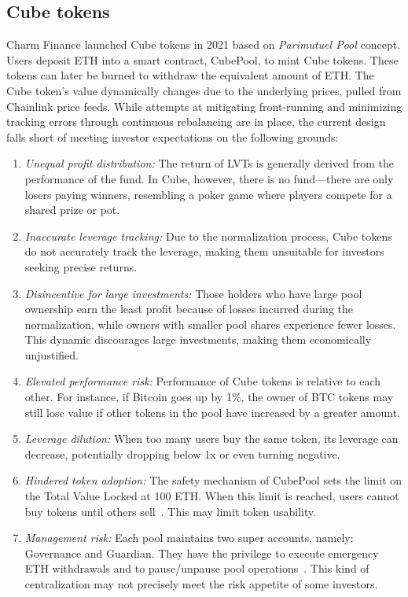\subsection{Cube tokens}\label{subsec:cube}
Charm Finance launched Cube tokens in 2021 based on \textit{Parimutuel Pool} concept. Users deposit ETH into a smart contract, CubePool, to mint Cube tokens. These tokens can later be burned to withdraw the equivalent amount of ETH. The Cube token's value dynamically changes due to the underlying prices, pulled from Chainlink price feeds. While attempts at mitigating front-running and minimizing tracking errors through continuous rebalancing are in place, the current design falls short of meeting investor expectations on the following grounds:
\begin{enumerate}[label={\ref{subsec:cube}.\arabic*},leftmargin=*]
	\item \textit{Unequal profit distribution:} The return of LVTs is generally derived from the performance of the fund. In Cube, however, there is no fund—there are only losers paying winners, resembling a poker game where players compete for a shared prize or pot.
	
	\item \textit{Inaccurate leverage tracking:} Due to the normalization process, Cube tokens do not accurately track the leverage, making them unsuitable for investors seeking precise returns.
	
	\item \textit{Disincentive for large investments:} Those holders who have large pool ownership earn the least profit because of losses incurred during the normalization, while owners with smaller pool shares experience fewer losses. This dynamic discourages large investments, making them economically unjustified.
	
	\item \textit{Elevated performance risk:} Performance of Cube tokens is relative to each other. For instance, if Bitcoin goes up by 1\%, the owner of BTC tokens may still lose value if other tokens in the pool have increased by a greater amount.
	
	\item \textit{Leverage dilution:} When too many users buy the same token, its leverage can decrease, potentially dropping below 1x or even turning negative.
	
	\item \textit{Hindered token adoption:} The safety mechanism of CubePool sets the limit on the Total Value Locked at 100 ETH. When this limit is reached, users cannot buy tokens until others sell~\cite{Cube_Github}. This may limit token usability.
	
	\item \textit{Management risk:} Each pool maintains two super accounts, namely: Governance and Guardian. They have the privilege to execute emergency ETH withdrawals and to pause/unpause pool operations~\cite{Cube_Faq}. This kind of centralization may not precisely meet the risk appetite of some investors.
\end{enumerate}

